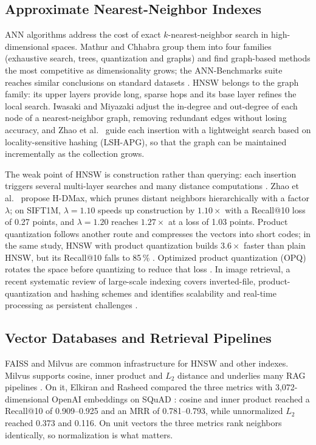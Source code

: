 \documentclass[conference, letterpaper]{IEEEtran}
\begin{document}
\subsection{Approximate Nearest-Neighbor Indexes}

ANN algorithms address the cost of exact $k$-nearest-neighbor search in high-dimensional spaces. Mathur and Chhabra \cite{mathur2024} group them into four families (exhaustive search, trees, quantization and graphs) and find graph-based methods the most competitive as dimensionality grows; the ANN-Benchmarks suite reaches similar conclusions on standard datasets \cite{aumuller2020}. HNSW \cite{malkov2020} belongs to the graph family: its upper layers provide long, sparse hops and its base layer refines the local search. Iwasaki and Miyazaki \cite{iwasaki2018} adjust the in-degree and out-degree of each node of a nearest-neighbor graph, removing redundant edges without losing accuracy, and Zhao et al.~\cite{zhao2023} guide each insertion with a lightweight search based on locality-sensitive hashing (LSH-APG), so that the graph can be maintained incrementally as the collection grows.

The weak point of HNSW is construction rather than querying: each insertion triggers several multi-layer searches and many distance computations \cite{zhao2025}. Zhao et al.~\cite{zhao2025} propose H-DMax, which prunes distant neighbors hierarchically with a factor $\lambda$; on SIFT1M, $\lambda=1.10$ speeds up construction by $1.10\times$ with a Recall@10 loss of 0.27 points, and $\lambda=1.20$ reaches $1.27\times$ at a loss of 1.03 points. Product quantization \cite{jegou2011} follows another route and compresses the vectors into short codes; in the same study, HNSW with product quantization builds $3.6\times$ faster than plain HNSW, but its Recall@10 falls to 85\,\% \cite{zhao2025}. Optimized product quantization (OPQ) rotates the space before quantizing to reduce that loss \cite{ge2014}. In image retrieval, a recent systematic review of large-scale indexing covers inverted-file, product-quantization and hashing schemes and identifies scalability and real-time processing as persistent challenges \cite{saouabe2024}.

\subsection{Vector Databases and Retrieval Pipelines}

FAISS \cite{johnson2021} and Milvus \cite{wang2021} are common infrastructure for HNSW and other indexes. Milvus supports cosine, inner product and $L_2$ distance and underlies many RAG pipelines \cite{lewis2020}. On it, Elkiran and Rasheed \cite{elkiran2025} compared the three metrics with 3,072-dimensional OpenAI embeddings on SQuAD \cite{rajpurkar2016}: cosine and inner product reached a Recall@10 of 0.909--0.925 and an MRR of 0.781--0.793, while unnormalized $L_2$ reached 0.373 and 0.116. On unit vectors the three metrics rank neighbors identically, so normalization is what matters.
\end{document}
